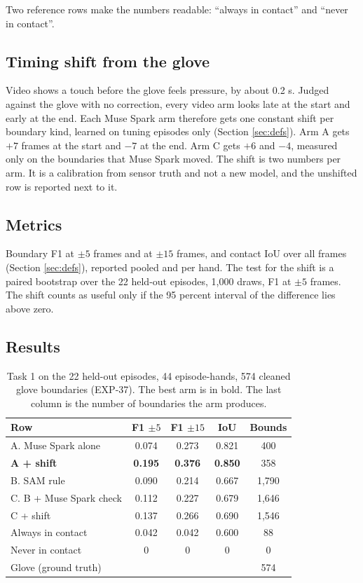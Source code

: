 \documentclass[10pt,twocolumn,letterpaper]{article}
\begin{document}
Two reference rows make the numbers readable: ``always in contact'' and
``never in contact''.

\subsection{Timing shift from the glove}

Video shows a touch before the glove feels pressure, by about 0.2 s. Judged
against the glove with no correction, every video arm looks late at the start
and early at the end. Each Muse Spark arm therefore gets one constant shift per
boundary kind, learned on tuning episodes only (Section \ref{sec:defs}). Arm A
gets $+7$ frames at the start and $-7$ at the end. Arm C gets $+6$ and $-4$,
measured only on the boundaries that Muse Spark moved. The shift is two numbers
per arm. It is a calibration from sensor truth and not a new model, and the
unshifted row is reported next to it.

\subsection{Metrics}

Boundary F1 at $\pm 5$ frames and at $\pm 15$ frames, and contact IoU over all
frames (Section \ref{sec:defs}), reported pooled and per hand. The test for
the shift is a paired bootstrap over the 22 held-out episodes, 1,000 draws,
F1 at $\pm 5$ frames. The shift counts as useful only if the 95 percent
interval of the difference lies above zero.

\subsection{Results}

\begin{table}[t]
\centering
\caption{Task 1 on the 22 held-out episodes, 44 episode-hands, 574 cleaned
glove boundaries (EXP-37). The best arm is in bold. The last column is the
number of boundaries the arm produces.}
\label{tab:num1}
\small
\begin{tabular}{lcccc}
\toprule
Row & F1 $\pm 5$ & F1 $\pm 15$ & IoU & Bounds \\
\midrule
A. Muse Spark alone      & 0.074 & 0.273 & 0.821 & 400 \\
\textbf{A + shift}       & \textbf{0.195} & \textbf{0.376} & \textbf{0.850} & 358 \\
B. SAM rule              & 0.090 & 0.214 & 0.667 & 1,790 \\
C. B + Muse Spark check  & 0.112 & 0.227 & 0.679 & 1,646 \\
C + shift                & 0.137 & 0.266 & 0.690 & 1,546 \\
Always in contact        & 0.042 & 0.042 & 0.600 & 88 \\
Never in contact         & 0 & 0 & 0 & 0 \\
\midrule
Glove (ground truth)     & & & & 574 \\
\bottomrule
\end{tabular}
\end{table}
\end{document}
